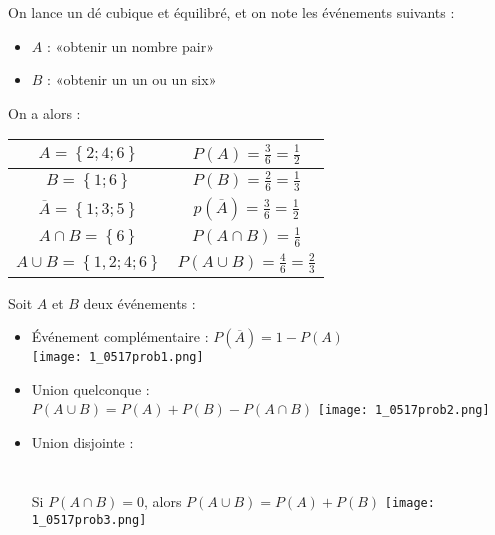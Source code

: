 \documentclass[a4paper,11pt]{article} \usepackage{FBarticle} \mapage{831}{Probabilités 1} %
\begin{document}
\begin{multicols}{2}
\exem On lance un dé cubique et équilibré, et on note les événements suivants :
\begin{itemize}
\item $A$ : «obtenir un nombre pair»
\item $B$ : «obtenir un un ou un six»
\end{itemize}
On a alors :
\begin{center}\begin{tabular}{|c|c|}\hline 
$A=\left\{2;4;6\right\}$ & $P(A)=\frac{3}{6}=\frac{1}{2}$\\ \hline
$B=\left\{1;6\right\}$ & $P(B)=\frac{2}{6}=\frac{1}{3}$ \\ \hline
$\overline{A}=\left\{1;3;5\right\}$ & $p\left(\overline{A}\right)=\frac{3}{6}=\frac{1}{2}$  \\ \hline
$A\cap B=\left\{6\right\}$ & $P(A\cap B)=\frac{1}{6}$ \\ \hline
$A\cup B=\left\{1,2;4;6\right\}$ & $P(A\cup B)=\frac{4}{6}=\frac{2}{3}$\\ \hline
\end{tabular}
\end{center}
\par

\prop Soit $A$ et $B$ deux événements :\\
\begin{itemize}
\item Événement complémentaire : $P(\overline{A})=1-P(A)$\\
\texttt{[image: 1\_0517prob1.png]}
\item Union quelconque :\\
$P(A\cup B)=P(A)+P(B)-P(A\cap B)$
\texttt{[image: 1\_0517prob2.png]}\\
\item Union disjointe :\\
\\
\prop\\ Si $P(A\cap B)=0$, alors $P(A\cup B)=P(A)+P(B)$
\texttt{[image: 1\_0517prob3.png]}
\end{itemize}\par



\end{multicols}
\end{document}
